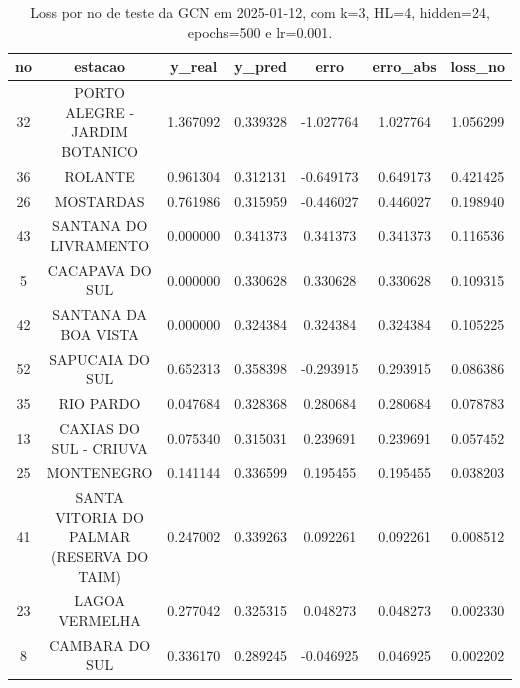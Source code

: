 \begin{table}[h]
\centering
\caption{Loss por no de teste da GCN em 2025-01-12, com k=3, HL=4, hidden=24, epochs=500 e lr=0.001.}
\label{tab:gcn_loss_k3_hl4_h24_e500_d20250112}
\begin{tabular}{ccccccc}
\toprule
no & estacao & y\_real & y\_pred & erro & erro\_abs & loss\_no \\
\midrule
32 & PORTO ALEGRE - JARDIM BOTANICO & 1.367092 & 0.339328 & -1.027764 & 1.027764 & 1.056299 \\
36 & ROLANTE & 0.961304 & 0.312131 & -0.649173 & 0.649173 & 0.421425 \\
26 & MOSTARDAS & 0.761986 & 0.315959 & -0.446027 & 0.446027 & 0.198940 \\
43 & SANTANA DO LIVRAMENTO & 0.000000 & 0.341373 & 0.341373 & 0.341373 & 0.116536 \\
5 & CACAPAVA DO SUL & 0.000000 & 0.330628 & 0.330628 & 0.330628 & 0.109315 \\
42 & SANTANA DA BOA VISTA & 0.000000 & 0.324384 & 0.324384 & 0.324384 & 0.105225 \\
52 & SAPUCAIA DO SUL & 0.652313 & 0.358398 & -0.293915 & 0.293915 & 0.086386 \\
35 & RIO PARDO & 0.047684 & 0.328368 & 0.280684 & 0.280684 & 0.078783 \\
13 & CAXIAS DO SUL - CRIUVA & 0.075340 & 0.315031 & 0.239691 & 0.239691 & 0.057452 \\
25 & MONTENEGRO & 0.141144 & 0.336599 & 0.195455 & 0.195455 & 0.038203 \\
41 & SANTA VITORIA DO PALMAR (RESERVA DO TAIM) & 0.247002 & 0.339263 & 0.092261 & 0.092261 & 0.008512 \\
23 & LAGOA VERMELHA & 0.277042 & 0.325315 & 0.048273 & 0.048273 & 0.002330 \\
8 & CAMBARA DO SUL & 0.336170 & 0.289245 & -0.046925 & 0.046925 & 0.002202 \\
\bottomrule
\end{tabular}
\end{table}

